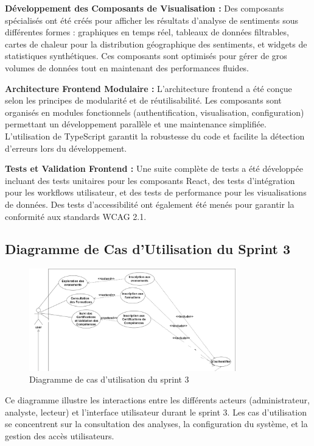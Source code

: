 \textbf{Développement des Composants de Visualisation :} Des composants spécialisés ont été créés pour afficher les résultats d'analyse de sentiments sous différentes formes : graphiques en temps réel, tableaux de données filtrables, cartes de chaleur pour la distribution géographique des sentiments, et widgets de statistiques synthétiques. Ces composants sont optimisés pour gérer de gros volumes de données tout en maintenant des performances fluides.

\textbf{Architecture Frontend Modulaire :} L'architecture frontend a été conçue selon les principes de modularité et de réutilisabilité. Les composants sont organisés en modules fonctionnels (authentification, visualisation, configuration) permettant un développement parallèle et une maintenance simplifiée. L'utilisation de TypeScript garantit la robustesse du code et facilite la détection d'erreurs lors du développement.

\textbf{Tests et Validation Frontend :} Une suite complète de tests a été développée incluant des tests unitaires pour les composants React, des tests d'intégration pour les workflows utilisateur, et des tests de performance pour les visualisations de données. Des tests d'accessibilité ont également été menés pour garantir la conformité aux standards WCAG 2.1.

\subsection{Diagramme de Cas d'Utilisation du Sprint 3}

\begin{figure}[H]
\centering
\includegraphics[width=0.8\textwidth]{assets/images/sprint3-usecase.png}
\caption{Diagramme de cas d'utilisation du sprint 3}
\label{fig:sprint3-usecase}
\end{figure}

Ce diagramme illustre les interactions entre les différents acteurs (administrateur, analyste, lecteur) et l'interface utilisateur durant le sprint 3. Les cas d'utilisation se concentrent sur la consultation des analyses, la configuration du système, et la gestion des accès utilisateurs.

